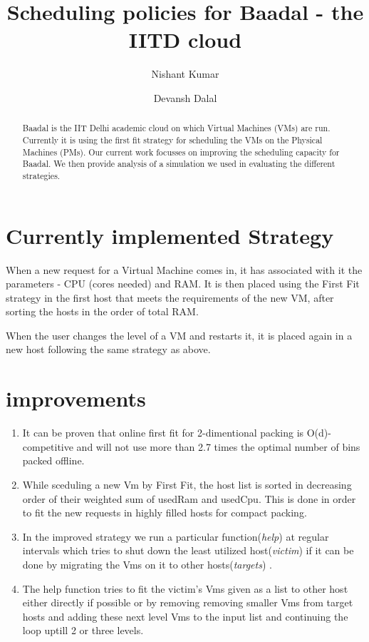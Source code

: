 \documentclass[a4paper,10pt]{article}
\title{Scheduling policies for Baadal - the IITD cloud}
\author{Nishant Kumar \and Devansh Dalal }
\begin{document}
\maketitle
\begin{abstract}
Baadal is the IIT Delhi academic cloud on which Virtual Machines (VMs) are run. Currently it is using the first fit strategy for scheduling the VMs on the Physical Machines (PMs). Our current work focusses on improving the scheduling capacity for Baadal. We then provide analysis of a simulation we used in evaluating the different strategies.
\end{abstract}

\section{Currently implemented Strategy}

When a new request for a Virtual Machine comes in, it has associated with it the parameters - CPU (cores needed) and RAM. It is then placed using the First Fit strategy in the first host that meets the requirements of the new VM, after sorting the hosts in the order of total RAM.

When the user changes the level of a VM and restarts it, it is placed again in a new host following the  same strategy as above. 

\section{improvements}


\begin{enumerate}

\item{ It can be proven that online first fit for 2-dimentional packing is O(d)-competitive and will not use more than 2.7 times the optimal number of bins packed offline. \cite{Garey1976}
 }
 \item{While sceduling a new Vm by First Fit, the host list is sorted in decreasing order of their weighted sum of usedRam and usedCpu. This is done in order to fit the new requests in highly filled hosts for compact packing.}
 
 \item{In the improved strategy we run a particular function(\textit{help}) at regular intervals which tries to shut down the least utilized host(\textit{victim}) if it can be done by migrating the Vms on it to other hosts(\textit{targets}) .}
  
  \item{The help function tries to fit the victim's Vms given as a list to other host either directly if possible or by removing removing smaller Vms from target hosts and adding these next level Vms to the input list and continuing the loop uptill 2 or three levels.    } 
  

\end{enumerate}
\end{document}
